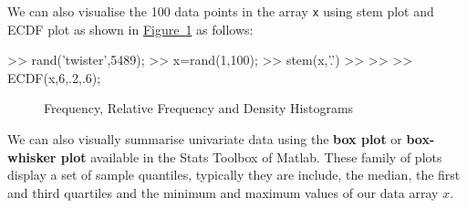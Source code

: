 \begin{labwork}\label{LW:StemEcdf}
We can also visualise the 100 data points in the array {\tt x} using stem plot and ECDF plot as shown in \hyperref[F:StemECDF100Unif01MT5489]{Figure~\ref*{F:StemECDF100Unif01MT5489}} as follows:
\begin{VrbM}
>> rand('twister',5489);
>> x=rand(1,100); %
>> stem(x,'.') %
>>%
>>%
>> ECDF(x,6,.2,.6);
\end{VrbM}
\end{labwork}

\begin{figure}[htpb]
\caption{Frequency, Relative Frequency and Density Histograms\label{F:StemECDF100Unif01MT5489}}
\centering   {}
\end{figure}

We can also visually summarise univariate data using the {\bf box plot} or {\bf box-whisker plot} available in the Stats Toolbox of {\sc Matlab}.  These family of plots display a set of sample quantiles, typically they are include, the median, the first and third quartiles and the minimum and maximum values of our data array $x$.

